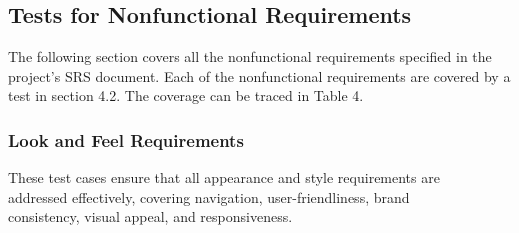 \documentclass[12pt, titlepage]{article}
\begin{document}
\pagebreak

\subsection{Tests for Nonfunctional Requirements}

\hspace{2em}The following section covers all the nonfunctional requirements specified in the project's SRS document.
Each of the nonfunctional requirements are covered by a test in section 4.2. The coverage can be traced in Table 4.

\subsubsection{Look and Feel Requirements}

These test cases ensure that all appearance and style requirements are\\
addressed effectively, covering navigation, user-friendliness, brand \\
consistency, visual appeal, and responsiveness.
\end{document}
